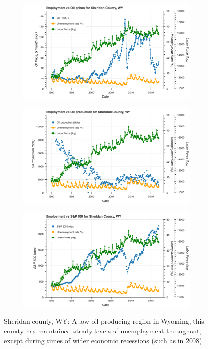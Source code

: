 \documentclass[11pt,letterpaper]{article}
\begin{document}
\begin{figure}
\centering
\begin{subfigure}{0.6\textwidth}
\includegraphics[width=\linewidth]{wy_sheridan_oil_price}
\end{subfigure}

\begin{subfigure}{0.6\textwidth}
\includegraphics[width=\linewidth]{wy_sheridan_oil_prod}
\end{subfigure}

\begin{subfigure}{0.6\textwidth}
\includegraphics[width=\linewidth]{wy_sheridan_snp}
\end{subfigure}
\caption{Sheridan county, WY: A low oil-producing region in Wyoming, this county has maintained steady levels of unemployment throughout, except during times of wider economic recessions (such as in 2008).}
\label{fig:wy_sheridan}
\end{figure}
\end{document}
